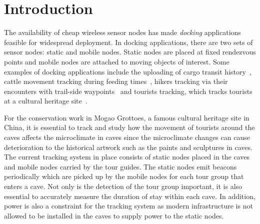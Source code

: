 \documentclass[twoside,twocolumn]{article}
\begin{document}




\articleType{}

\maketitle



\section{Introduction} 
\label{sec:introduction}
The availability of cheap wireless sensor nodes has made \emph{docking} applications~\citep{Dutta2008Practical} 
feasible for widespread deployment. In docking applications, there are two sets of sensor nodes: static and mobile
nodes. Static nodes are placed at fixed rendezvous points and mobile nodes are attached to moving objects of interest.
Some examples of docking applications include the uploading of cargo transit history~\citep{malinowski2007cargonet}, 
cattle movement tracking during feeding times~\citep{wark2007model}, hikers tracking via their encounters with trail-side 
waypoints~\citep{huang2005cenwits} and tourists tracking, which tracks tourists at a cultural heritage site~\citep{ming2008wireless}.

For the conservation work in Mogao Grottoes, a famous cultural heritage site in China, it is essential to track and 
study how the movement of tourists around the caves affects the microclimate in caves since the microclimate changes
can cause deterioration to the historical artwork such as the paints and sculptures in caves. The current tracking 
system in place consists of static nodes placed in the caves and mobile nodes carried by the tour guides. The static 
nodes emit beacons periodically which are picked up by the mobile nodes for each tour group that enters a cave. Not 
only is the detection of the tour group important, it is also essential to accurately measure the duration of stay 
within each cave. In addition, power is also a constraint for the tracking system as modern infrastructure is not 
allowed to be installed in the caves to supply power to the static nodes.
\end{document}

